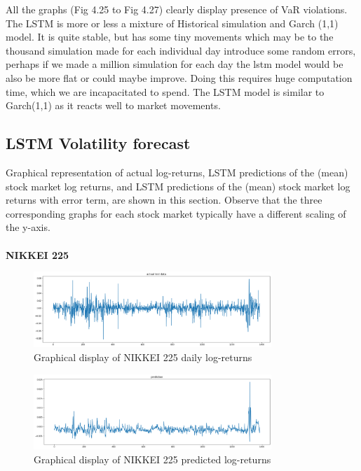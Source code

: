 \documentclass[a4paper,11pt,oneside]{book}
\begin{document}
All the graphs (Fig 4.25 to Fig 4.27) clearly display presence of VaR violations. The LSTM is more or less a mixture of Historical simulation and Garch (1,1) model. It is quite stable, but has some tiny movements which may be to the thousand simulation made for each individual day introduce some random errors, perhaps if we made a million simulation for each day the lstm model would be also be more flat or could maybe improve. Doing this requires huge computation time, which we are incapacitated to spend. The LSTM model is similar to Garch(1,1) as it reacts well to market movements.

	
\subsection{LSTM Volatility forecast}
Graphical representation of actual log-returns, LSTM predictions of the (mean) stock market log returns, and LSTM predictions of the (mean) stock market log returns with error term, are shown in this section. Observe that the three corresponding graphs for each stock market typically have a different scaling of the y-axis.\\\\
\textbf{NIKKEI 225}
\begin{figure}[!h]
	\centering
	\includegraphics[width=0.8\textwidth]{figures/NIKKEITEST}
	\caption{Graphical display of NIKKEI 225 daily log-returns}
	\label{NIKKEITEST}
	

\end{figure}
\newpage
\begin{figure}[!h]
	\centering
	\includegraphics[width=0.8\textwidth]{figures/NIKKEIPRED}
	\caption{Graphical display of NIKKEI 225 predicted log-returns}
	\label{NIKKEIPRED}
\end{figure}
\end{document}
